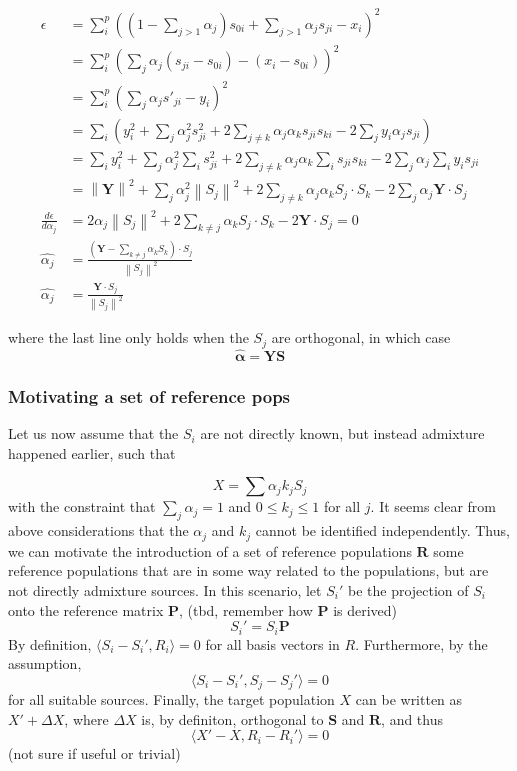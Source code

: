 \documentclass[12pt,fullpage, a4paper]{article}
\newcommand{\normsq}[1]{\left\lVert#1\right\rVert^2}
\newcommand{\MS}{\mathbf{S}} %
\newcommand{\MR}{\mathbf{R}} %
\newcommand{\MY}{\mathbf{Y}} %
\newcommand{\MP}{\mathbf{P}} %
\newcommand{\MALPHA}{\boldsymbol{\alpha}}
\begin{document}
\begin{align}
\epsilon &=  \sum_i^p \left( \left(1 - \sum_{j>1}\alpha_j\right)s_{0i} + \sum_{j>1} \alpha_j s_{ji} - x_{i}\right)^2\\
&= \sum_i^p \left( \sum_j \alpha_j (s_{ji}-s_{0i}) - (x_{i} - s_{0i})\right)^2\\
&= \sum_i^p \left( \sum_j \alpha_j s'_{ji} - y_{i}\right)^2\\
&= \sum_i \left( y_i^2 + \sum_j \alpha_j^2 s_{ji}^2 + 2\sum_{j\neq k} \alpha_j\alpha_k s_{ji}s_{ki} - 2\sum_j y_i \alpha_j s_{ji} \right)\\
&=\sum_i y_i^2 + \sum_j \alpha_j^2\sum_i s^2_{ji} + 2 \sum_{j\neq k}\alpha_j\alpha_k \sum_i s_{ji} s_{ki} - 2 \sum_j \alpha_j \sum_i y_i s_{ji}\\
&= \normsq{\MY} + \sum_j \alpha_j^2 \normsq{S_j} + 2 \sum_{j\neq k} \alpha_j \alpha_k S_j \cdot S_k - 2 \sum_j \alpha_j \MY \cdot S_j\\
\frac{d\epsilon}{d\alpha_j} &=  2\alpha_j \normsq{S_j} + 2 \sum_{k\neq j} \alpha_k S_j \cdot S_k - 2 \MY \cdot S_j = 0\\
\hat{\alpha_j} &= \frac{(\MY - \sum_{k\neq j} \alpha_k S_k) \cdot S_j}{\normsq{S_j}} \\
\hat{\alpha_j} &= \frac{\MY \cdot S_j}{\normsq{S_j}} 
\end{align}

where the last line only holds when the $S_j$ are orthogonal, in which case 
$$\hat{\MALPHA} = \MY \MS$$


\subsubsection{Motivating a set of reference pops}
Let us now assume that the $S_i$ are not directly known, but instead admixture happened earlier, such that  

\begin{equation}
X = \sum \alpha_j k_j S_j
\end{equation}
with the constraint that $\sum_j \alpha_j = 1$ and $0 \leq k_j \leq 1$ for all $j$. It seems clear from above considerations that the $\alpha_j$ and $k_j$ cannot be identified independently. Thus, we can motivate the introduction of a set of reference populations $\MR$ some reference populations that are in some way related to the populations, but are not directly admixture sources. In this scenario, let $S_i'$ be the projection of $S_i$ onto the reference matrix $\MP$, (tbd, remember how $\MP$ is derived)
\begin{equation}
S_i' = S_i \MP
\end{equation}
By definition, $\langle S_i - S_i', R_i\rangle = 0$ for all basis vectors in $R$. Furthermore, by the assumption,
$$\langle S_i - S_i', S_j - S_j' \rangle = 0$$ for all suitable sources. Finally, the target population $X$ can be written as $X' + \Delta X$, where $\Delta X$ is, by definiton, orthogonal to $\MS$ and $\MR$, and thus
\begin{equation}
\langle X' - X, R_i - R_i' \rangle = 0
\end{equation} (not sure if useful or trivial)
\end{document}
